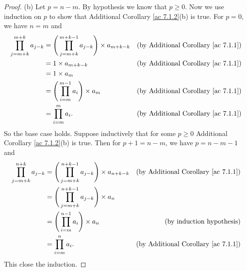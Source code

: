 \begin{proof}{(b)}
    Let \(p = n - m\).
    By hypothesis we know that \(p \geq 0\).
    Now we use induction on \(p\) to show that Additional Corollary \ref{ac 7.1.2}(b) is true.
    For \(p = 0\), we have \(n = m\) and
    \begin{align*}
        \prod_{j = m + k}^{m + k} a_{j - k} & = \Bigg(\prod_{j = m + k}^{m + k - 1} a_{j - k}\Bigg) \times a_{m + k - k} & \text{(by Additional Corollary \ref{ac 7.1.1})} \\
                                            & = 1 \times a_{m + k - k}                                                   & \text{(by Additional Corollary \ref{ac 7.1.1})} \\
                                            & = 1 \times a_m                                                                                                               \\
                                            & = \Bigg(\prod_{i = m}^{m - 1} a_i\Bigg) \times a_m                         & \text{(by Additional Corollary \ref{ac 7.1.1})} \\
                                            & = \prod_{i = m}^m a_i.                                                     & \text{(by Additional Corollary \ref{ac 7.1.1})}
    \end{align*}
    So the base case holds.
    Suppose inductively that for some \(p \geq 0\) Additional Corollary \ref{ac 7.1.2}(b) is true.
    Then for \(p + 1 = n - m\), we have \(p = n - m - 1\) and
    \begin{align*}
        \prod_{j = m + k}^{n + k} a_{j - k} & = \Bigg(\prod_{j = m + k}^{n + k - 1} a_{j - k}\Bigg) \times a_{n + k - k} & \text{(by Additional Corollary \ref{ac 7.1.1})} \\
                                            & = \Bigg(\prod_{j = m + k}^{n + k - 1} a_{j - k}\Bigg) \times a_n                                                             \\
                                            & = \Bigg(\prod_{i = m}^{n - 1} a_i\Bigg) \times a_n                         & \text{(by induction hypothesis)}                \\
                                            & = \prod_{i = m}^n a_i.                                                     & \text{(by Additional Corollary \ref{ac 7.1.1})}
    \end{align*}
    This close the induction.
\end{proof}

